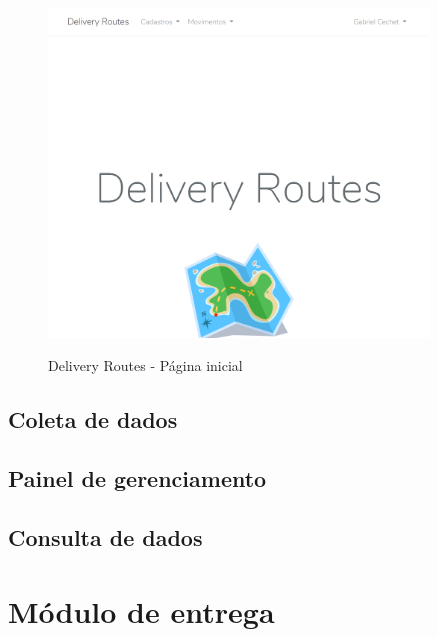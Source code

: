 \begin{figure}[H]
    \centering
    \caption{Delivery Routes - Página inicial}
    \includegraphics[width=0.9\textwidth]{./dados/figuras/fig7}
    \label{fig:apphome}
\end{figure}

\subsection{Coleta de dados}

\subsection{Painel de gerenciamento}

\subsection{Consulta de dados}

\section{Módulo de entrega}
